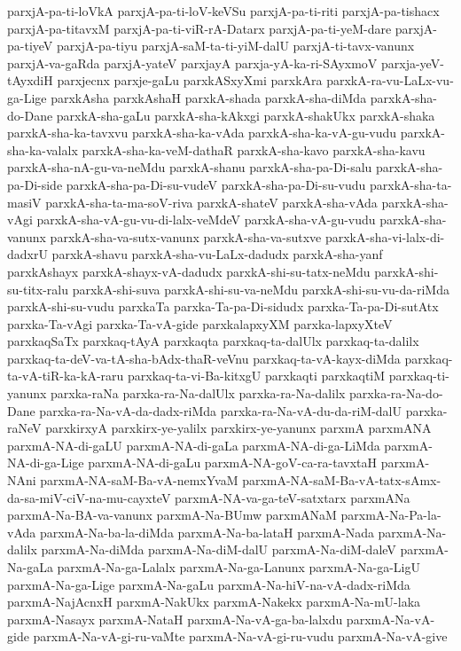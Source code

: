 {parxjA-pa-ti-loVkA
parxjA-pa-ti-loV-keVSu
parxjA-pa-ti-riti
parxjA-pa-tishacx
parxjA-pa-titavxM
parxjA-pa-ti-viR-rA-Datarx
parxjA-pa-ti-yeM-dare
parxjA-pa-tiyeV
parxjA-pa-tiyu
parxjA-saM-ta-ti-yiM-dalU
parxjA-ti-tavx-vanunx
parxjA-va-gaRda
parxjA-yateV
parxjayA
parxja-yA-ka-ri-SAyxmoV
parxja-yeV-tAyxdiH
parxjecnx
parxje-gaLu
parxkASxyXmi
parxkAra
parxkA-ra-vu-LaLx-vu-ga-Lige
parxkAsha
parxkAshaH
parxkA-shada
parxkA-sha-diMda
parxkA-sha-do-Dane
parxkA-sha-gaLu
parxkA-sha-kAkxgi
parxkA-shakUkx
parxkA-shaka
parxkA-sha-ka-tavxvu
parxkA-sha-ka-vAda
parxkA-sha-ka-vA-gu-vudu
parxkA-sha-ka-valalx
parxkA-sha-ka-veM-dathaR
parxkA-sha-kavo
parxkA-sha-kavu
parxkA-sha-nA-gu-va-neMdu
parxkA-shanu
parxkA-sha-pa-Di-salu
parxkA-sha-pa-Di-side
parxkA-sha-pa-Di-su-vudeV
parxkA-sha-pa-Di-su-vudu
parxkA-sha-ta-masiV
parxkA-sha-ta-ma-soV-riva
parxkA-shateV
parxkA-sha-vAda
parxkA-sha-vAgi
parxkA-sha-vA-gu-vu-di-lalx-veMdeV
parxkA-sha-vA-gu-vudu
parxkA-sha-vanunx
parxkA-sha-va-sutx-vanunx
parxkA-sha-va-sutxve
parxkA-sha-vi-lalx-di-dadxrU
parxkA-shavu
parxkA-sha-vu-LaLx-dadudx
parxkA-sha-yanf
parxkAshayx
parxkA-shayx-vA-dadudx
parxkA-shi-su-tatx-neMdu
parxkA-shi-su-titx-ralu
parxkA-shi-suva
parxkA-shi-su-va-neMdu
parxkA-shi-su-vu-da-riMda
parxkA-shi-su-vudu
parxkaTa
parxka-Ta-pa-Di-sidudx
parxka-Ta-pa-Di-sutAtx
parxka-Ta-vAgi
parxka-Ta-vA-gide
parxkalapxyXM
parxka-lapxyXteV
parxkaqSaTx
parxkaq-tAyA
parxkaqta
parxkaq-ta-dalUlx
parxkaq-ta-dalilx
parxkaq-ta-deV-va-tA-sha-bAdx-thaR-veVnu
parxkaq-ta-vA-kayx-diMda
parxkaq-ta-vA-tiR-ka-kA-raru
parxkaq-ta-vi-Ba-kitxgU
parxkaqti
parxkaqtiM
parxkaq-ti-yanunx
parxka-raNa
parxka-ra-Na-dalUlx
parxka-ra-Na-dalilx
parxka-ra-Na-do-Dane
parxka-ra-Na-vA-da-dadx-riMda
parxka-ra-Na-vA-du-da-riM-dalU
parxka-raNeV
parxkirxyA
parxkirx-ye-yalilx
parxkirx-ye-yanunx
parxmA
parxmANA
parxmA-NA-di-gaLU
parxmA-NA-di-gaLa
parxmA-NA-di-ga-LiMda
parxmA-NA-di-ga-Lige
parxmA-NA-di-gaLu
parxmA-NA-goV-ca-ra-tavxtaH
parxmA-NAni
parxmA-NA-saM-Ba-vA-nemxYvaM
parxmA-NA-saM-Ba-vA-tatx-sAmx-da-sa-miV-ciV-na-mu-cayxteV
parxmA-NA-va-ga-teV-satxtarx
parxmANa
parxmA-Na-BA-va-vanunx
parxmA-Na-BUmw
parxmANaM
parxmA-Na-Pa-la-vAda
parxmA-Na-ba-la-diMda
parxmA-Na-ba-lataH
parxmA-Nada
parxmA-Na-dalilx
parxmA-Na-diMda
parxmA-Na-diM-dalU
parxmA-Na-diM-daleV
parxmA-Na-gaLa
parxmA-Na-ga-Lalalx
parxmA-Na-ga-Lanunx
parxmA-Na-ga-LigU
parxmA-Na-ga-Lige
parxmA-Na-gaLu
parxmA-Na-hiV-na-vA-dadx-riMda
parxmA-NajAcnxH
parxmA-NakUkx
parxmA-Nakekx
parxmA-Na-mU-laka
parxmA-Nasayx
parxmA-NataH
parxmA-Na-vA-ga-ba-lalxdu
parxmA-Na-vA-gide
parxmA-Na-vA-gi-ru-vaMte
parxmA-Na-vA-gi-ru-vudu
parxmA-Na-vA-give
}
